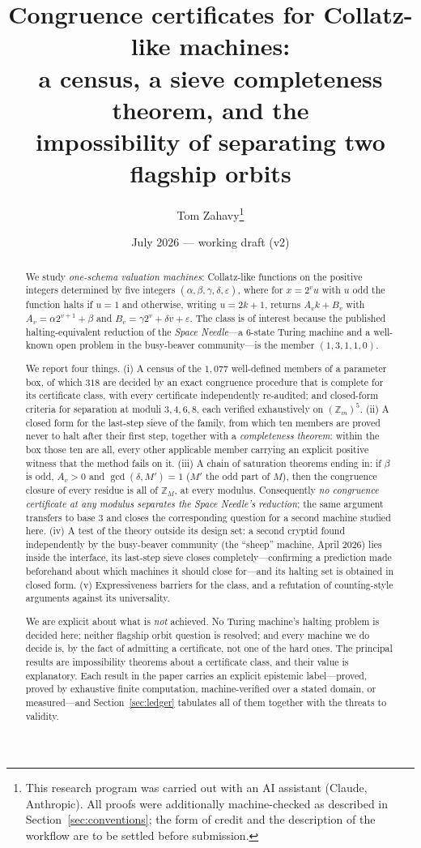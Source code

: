 \documentclass[11pt]{article}
\title{Congruence certificates for Collatz-like machines:\\
a census, a sieve completeness theorem, and the\\
impossibility of separating two flagship orbits}
\author{Tom Zahavy\thanks{This research program was carried out with an AI
assistant (Claude, Anthropic).  All proofs were additionally machine-checked
as described in Section~\ref{sec:conventions}; the form of credit and the
description of the workflow are to be settled before submission.}}
\date{July 2026 --- working draft (v2)}
\theoremstyle{definition}
\theoremstyle{remark}
\newcommand{\Z}{\mathbb{Z}}
\begin{document}
\maketitle

\begin{abstract}
We study \emph{one-schema valuation machines}: Collatz-like functions on the
positive integers determined by five integers
$(\alpha,\beta,\gamma,\delta,\varepsilon)$, where for $x=2^{v}u$ with $u$ odd
the function halts if $u=1$ and otherwise, writing $u=2k+1$, returns
$A_v k+B_v$ with $A_v=\alpha 2^{v+1}+\beta$ and
$B_v=\gamma 2^{v}+\delta v+\varepsilon$.  The class is of interest because the
published halting-equivalent reduction of the \emph{Space Needle}---a $6$-state
Turing machine and a well-known open problem in the busy-beaver
community---is the member $(1,3,1,1,0)$.

We report four things.  (i) A census of the $1{,}077$ well-defined members of
a parameter box, of which $318$ are decided by an exact congruence procedure
that is complete for its certificate class, with every certificate
independently re-audited; and closed-form criteria for separation at moduli
$3,4,6,8$, each verified exhaustively on $(\Z_m)^5$.  (ii) A closed form for
the last-step sieve of the family, from which ten members are proved never to
halt after their first step, together with a \emph{completeness theorem}:
within the box those ten are all, every other applicable member carrying an
explicit positive witness that the method fails on it.  (iii) A chain of
saturation theorems ending in: if $\beta$ is odd, $A_v>0$ and
$\gcd(\delta,M')=1$ ($M'$ the odd part of $M$), then the congruence closure of
every residue is all of $\Z_M$, at every modulus.  Consequently \emph{no
congruence certificate at any modulus separates the Space Needle's reduction};
the same argument transfers to base $3$ and closes the corresponding question
for a second machine studied here.  (iv) A test of the theory outside its design set: a
second cryptid found independently by the busy-beaver community (the ``sheep''
machine, April 2026) lies inside the interface, its last-step sieve closes
completely---confirming a prediction made beforehand about which machines it
should close for---and its halting set is obtained in closed form.  (v)
Expressiveness barriers for the class, and a refutation of counting-style
arguments against its universality.

We are explicit about what is \emph{not} achieved.  No Turing machine's
halting problem is decided here; neither flagship orbit question is resolved;
and every machine we do decide is, by the fact of admitting a certificate, not
one of the hard ones.  The principal results are impossibility theorems about
a certificate class, and their value is explanatory.  Each result in the paper
carries an explicit epistemic label---proved, proved by exhaustive finite
computation, machine-verified over a stated domain, or measured---and
Section~\ref{sec:ledger} tabulates all of them together with the threats to
validity.
\end{abstract}
\end{document}
